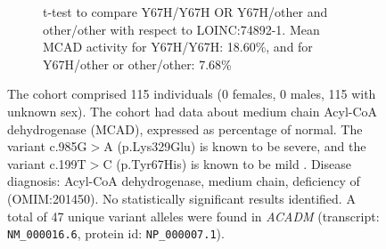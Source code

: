 \begin{figure}[htbp]
\vspace{2em}

\begin{subfigure}[b]{0.95\textwidth}
\captionsetup{justification=raggedright,singlelinecheck=false}
\caption{t-test to compare Y67H/Y67H OR Y67H/other and other/other with respect to LOINC:74892-1. Mean MCAD activity for Y67H/Y67H: 18.60\%, and for Y67H/other or other/other: 7.68\% }
\end{subfigure}

\vspace{2em}

\caption{The cohort comprised 115 individuals (0 females, 0 males, 115 with unknown sex). The cohort had data about  medium chain Acyl-CoA dehydrogenase (MCAD), expressed as percentage of normal.
The variant c.985G$>$A (p.Lys329Glu) is known to be severe, and the variant c.199T$>$C (p.Tyr67His) is known to be mild \cite{PMID_33580884}.
Disease diagnosis: Acyl-CoA dehydrogenase, medium chain, deficiency of (OMIM:201450). No statistically significant results identified. A total of 47 unique variant alleles were found in \textit{ACADM} (transcript: \texttt{NM\_000016.6}, protein id: \texttt{NP\_000007.1}).}
\end{figure}
